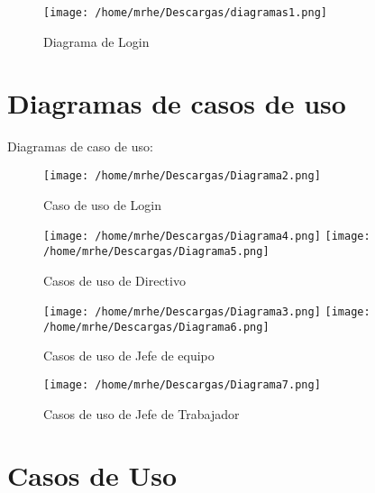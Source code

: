 \documentclass[11pt,a4paper]{article}
\begin{document}
\begin{figure}[htb]
\begin{center}
\caption{Diagrama de Login}
\texttt{[image: /home/mrhe/Descargas/diagramas1.png]}
\end{center}
\end{figure}

\cleardoublepage
\section{Diagramas de casos de uso}
Diagramas de caso de uso:
\\
\begin{figure}[htb]
\begin{center}
\caption{Caso de uso de Login}

\texttt{[image: /home/mrhe/Descargas/Diagrama2.png]}

\end{center}
\end{figure}
\begin{figure}[htb]
\begin{center}
\caption{Casos de uso de Directivo}
\texttt{[image: /home/mrhe/Descargas/Diagrama4.png]}
\texttt{[image: /home/mrhe/Descargas/Diagrama5.png]}
\end{center}
\end{figure}
\begin{figure}[htb]
\begin{center}
\caption{Casos de uso de Jefe de equipo}
\texttt{[image: /home/mrhe/Descargas/Diagrama3.png]}
\texttt{[image: /home/mrhe/Descargas/Diagrama6.png]}

\end{center}
\end{figure}

\begin{figure}[htb]
\begin{center}
\caption{Casos de uso de Jefe de Trabajador}
\texttt{[image: /home/mrhe/Descargas/Diagrama7.png]}

\end{center}
\end{figure}

\cleardoublepage
\cleardoublepage

\section{Casos de Uso}
\end{document}
